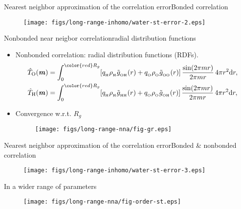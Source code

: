 \documentclass{beamer}
\newcommand{\redc}[1]{{\color{red} #1}}
\newcommand{\bluec}[1]{{\color{blue} #1}}
\newcommand{\vect}[1]{\textbf{\textit{#1}}}
\renewcommand{\d}[1]{\textrm{#1}}
\begin{document}
\begin{frame}{Nearest neighbor approximation of the correlation error}{Bonded correlation}
  \begin{figure}
    \centering
    \texttt{[image: figs/long-range-inhomo/water-st-error-2.eps]}
  \end{figure}  
\end{frame}

\begin{frame}{Nonbonded near neigbor correlation}{radial distribution functions}
  \begin{itemize}
  \item <1-> Nonbonded correlation: radial distribution functions (RDFs).
    \bluec{
    \begin{align*}
          \hat T_{\textrm{O}} (\vect m)
    &= \int_0^{\redc{R_g}}
    [q_{_{\textrm{H}}} \rho_{_{\textrm{H}}} \tilde g_{_{\textrm{OH}}}(r)
    +q_{_{\textrm{O}}} \rho_{_{\textrm{O}}} \tilde g_{_{\textrm{OO}}}(r)]
    \,\frac{\sin(2\pi m r)}{2\pi mr}\,4\pi r^2 \d dr,\\\label{eqn:nb-nna-2}
    \hat T_{\textrm{H}} (\vect m)
    &= \int_0^{\redc{R_g}}
    [q_{_{\textrm{H}}} \rho_{_{\textrm{H}}} \tilde g_{_{\textrm{HH}}}(r)
    +q_{_{\textrm{O}}} \rho_{_{\textrm{O}}} \tilde g_{_{\textrm{OH}}}(r)]
    \,\frac{\sin(2\pi m r)}{2\pi mr}\,4\pi r^2 \d dr,
  \end{align*}
  }
  \item <2-> Convergence w.r.t. \redc{$R_g$}
    \begin{figure}
    \centering
    \hfill
    \texttt{[image: figs/long-range-nna/fig-gr.eps]}
  \end{figure}
  \end{itemize}
\end{frame}


\begin{frame}{Nearest neighbor approximation of the correlation error}{Bonded \& nonbonded correlation}
  \begin{figure}
    \centering
    \texttt{[image: figs/long-range-inhomo/water-st-error-3.eps]}
  \end{figure}  
\end{frame}

\begin{frame}{In a wider  range of parameters}
  \begin{figure}
    \centering
    \texttt{[image: figs/long-range-nna/fig-order-st.eps]}
  \end{figure}  
\end{frame}
\end{document}
